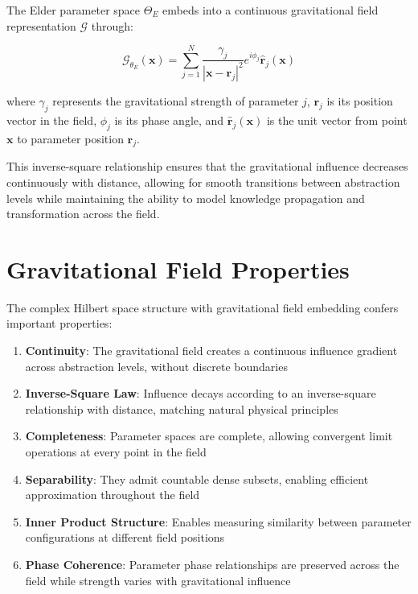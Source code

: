 \begin{theorem}
The Elder parameter space $\Theta_E$ embeds into a continuous gravitational field representation $\mathcal{G}$ through:

\begin{equation}
\mathcal{G}_{\theta_E}(\mathbf{x}) = \sum_{j=1}^N \frac{\gamma_j}{|\mathbf{x} - \mathbf{r}_j|^2} e^{i\phi_j} \hat{\mathbf{r}}_j(\mathbf{x})
\end{equation}

where $\gamma_j$ represents the gravitational strength of parameter $j$, $\mathbf{r}_j$ is its position vector in the field, $\phi_j$ is its phase angle, and $\hat{\mathbf{r}}_j(\mathbf{x})$ is the unit vector from point $\mathbf{x}$ to parameter position $\mathbf{r}_j$.

This inverse-square relationship ensures that the gravitational influence decreases continuously with distance, allowing for smooth transitions between abstraction levels while maintaining the ability to model knowledge propagation and transformation across the field.
\end{theorem}

\section{Gravitational Field Properties}

The complex Hilbert space structure with gravitational field embedding confers important properties:

\begin{enumerate}
    \item \textbf{Continuity}: The gravitational field creates a continuous influence gradient across abstraction levels, without discrete boundaries
    
    \item \textbf{Inverse-Square Law}: Influence decays according to an inverse-square relationship with distance, matching natural physical principles
    
    \item \textbf{Completeness}: Parameter spaces are complete, allowing convergent limit operations at every point in the field
    
    \item \textbf{Separability}: They admit countable dense subsets, enabling efficient approximation throughout the field
    
    \item \textbf{Inner Product Structure}: Enables measuring similarity between parameter configurations at different field positions
    
    \item \textbf{Phase Coherence}: Parameter phase relationships are preserved across the field while strength varies with gravitational influence
\end{enumerate}

